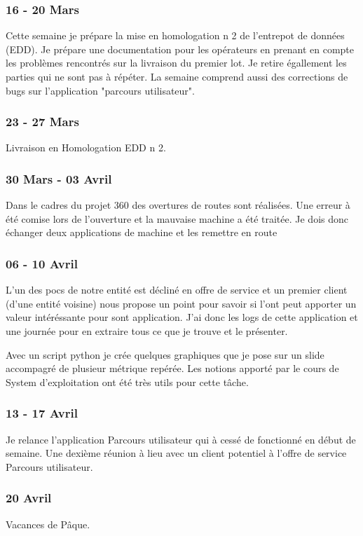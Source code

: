 \subsubsection*{16 - 20 Mars}
Cette semaine je prépare la mise en homologation n 2 de l'entrepot de données (EDD). Je prépare une documentation pour les opérateurs en prenant en compte les problèmes rencontrés sur la livraison du premier lot. Je retire égallement les parties qui ne sont pas à répéter. La semaine comprend aussi des corrections de bugs sur l'application "parcours utilisateur".

\subsubsection*{23 - 27 Mars}
Livraison en Homologation EDD n 2.

\subsubsection*{30 Mars - 03 Avril}
Dans le cadres du projet 360 des overtures de routes sont réalisées. Une erreur à été comise lors de l'ouverture et la mauvaise machine a été traitée. Je dois donc échanger deux applications de machine et les remettre en route

\subsubsection*{06 - 10 Avril}
L'un des pocs de notre entité est décliné en offre de service et un premier client (d'une entité voisine) nous propose un point pour savoir si l'ont peut apporter un valeur intéréssante pour sont application.
J'ai donc les logs de cette application et une journée pour en extraire tous ce que je trouve et le présenter. 

Avec un script python je crée quelques graphiques que je pose sur un slide accompagré de plusieur métrique repérée. Les notions apporté par le cours de System d'exploitation ont été très utils pour cette tâche.

\subsubsection*{13 - 17 Avril}
Je relance l'application Parcours utilisateur qui à cessé de fonctionné en début de semaine. Une dexième réunion à lieu avec un client potentiel à l'offre de service Parcours utilisateur.

\subsubsection*{20 Avril}
Vacances de Pâque.

